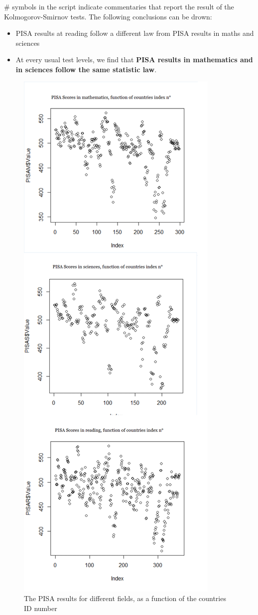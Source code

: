 \documentclass[12pt,a4paper]{article}
\begin{document}
\# symbols in the script indicate commentaries that report the result of the Kolmogorov-Smirnov tests. The following conclusions can be drown:
\begin{itemize}
	\item PISA results at reading follow a different law from PISA results in maths and sciences
	\item At every usual test levels, we find that \textbf{PISA results in mathematics and in sciences follow the same statistic law}.
\end{itemize}

\begin{figure}
	\centering
	\caption{The PISA results for different fields, as a function of the countries ID number}
	\includegraphics[scale=0.4]{img/IntraDependencePISA.png}
\end{figure}
\end{document}
